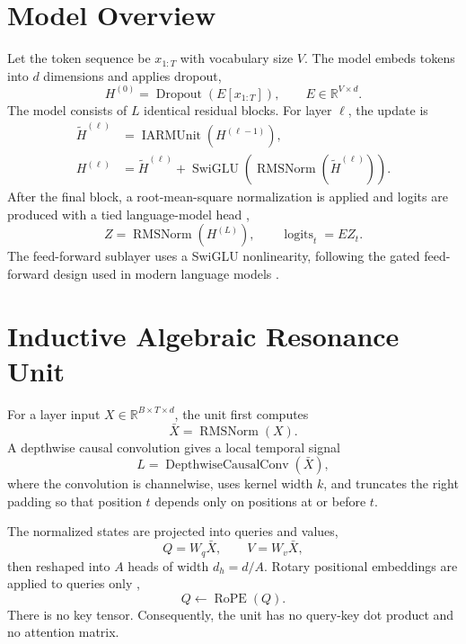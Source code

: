 \documentclass[10pt]{article}
\newcommand{\R}{\mathbb{R}}
\begin{document}
\section{Model Overview}
Let the token sequence be $x_{1:T}$ with vocabulary size $V$. The model embeds tokens into $d$ dimensions and applies dropout,
\begin{equation}
H^{(0)} = \operatorname{Dropout}(E[x_{1:T}]), \qquad E \in \R^{V\times d}. 
\end{equation}
The model consists of $L$ identical residual blocks. For layer $\ell$, the update is
\begin{align}
\widetilde H^{(\ell)} &= \operatorname{IARMUnit}\!\left(H^{(\ell-1)}\right), \\
H^{(\ell)} &= \widetilde H^{(\ell)} + \operatorname{SwiGLU}\!\left(\operatorname{RMSNorm}(\widetilde H^{(\ell)})\right).
\end{align}
After the final block, a root-mean-square normalization \cite{zhang2019root} is applied and logits are produced with a tied language-model head \cite{inan2017tying,press2017using},
\begin{equation}
Z = \operatorname{RMSNorm}(H^{(L)}), \qquad \operatorname{logits}_t = E Z_t.
\end{equation}
The feed-forward sublayer uses a SwiGLU nonlinearity, following the gated feed-forward design used in modern language models \cite{shazeer2020glu}.

\section{Inductive Algebraic Resonance Unit}
For a layer input $X\in\R^{B\times T\times d}$, the unit first computes
\begin{equation}
\bar X = \operatorname{RMSNorm}(X).
\end{equation}
A depthwise causal convolution gives a local temporal signal
\begin{equation}
L = \operatorname{DepthwiseCausalConv}(\bar X),
\end{equation}
where the convolution is channelwise, uses kernel width $k$, and truncates the right padding so that position $t$ depends only on positions at or before $t$.

The normalized states are projected into queries and values,
\begin{equation}
Q = W_q \bar X, \qquad V = W_v \bar X,
\end{equation}
then reshaped into $A$ heads of width $d_h=d/A$. Rotary positional embeddings are applied to queries only \cite{su2021roformer},
\begin{equation}
Q \leftarrow \operatorname{RoPE}(Q).
\end{equation}
There is no key tensor. Consequently, the unit has no query-key dot product and no attention matrix.
\end{document}
